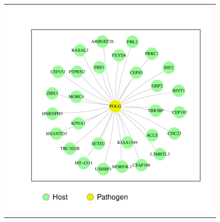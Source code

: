 \documentclass[a4paper,11pt]{article}
\begin{document}
\begin{figure}
\begin{tabular}{c}
\begin{minipage}{0.4\textwidth}
\begin{center}
\includegraphics[scale=0.25, trim = 0.7cm 0.7cm 0.7cm 0.7cm]{flavinet.pdf}
\end{center}
\end{minipage}
\\
\begin{minipage}{0.4\textwidth}
\begin{center}

\end{center}
\end{minipage}
\end{tabular}
\end{figure}
\end{document}
